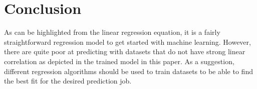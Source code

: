 \documentclass[conference]{IEEEtran}
\begin{document}
\section{Conclusion}
As can be highlighted from the linear regression equation, it is a fairly straightforward regression model to get started with machine learning. However, there are quite poor at predicting with datasets that do not have strong linear correlation as depicted in the trained model in this paper. As a suggestion, different regression algorithms should be used to train datasets to be able to find the best fit for the desired prediction job.



\end{document}
